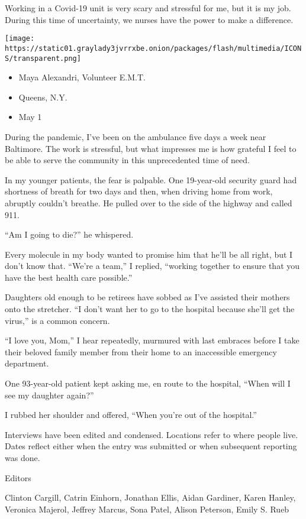 Working in a Covid-19 unit is very scary and stressful for me, but it is
my job. During this time of uncertainty, we nurses have the power to
make a difference.

\texttt{[image: https://static01.graylady3jvrrxbe.onion/packages/flash/multimedia/ICONS/transparent.png]}

\begin{itemize}
\tightlist
\item
  Maya Alexandri, Volunteer E.M.T.
\item
  Queens, N.Y.
\item
  May 1
\end{itemize}

During the pandemic, I've been on the ambulance five days a week near
Baltimore. The work is stressful, but what impresses me is how grateful
I feel to be able to serve the community in this unprecedented time of
need.

In my younger patients, the fear is palpable. One 19-year-old security
guard had shortness of breath for two days and then, when driving home
from work, abruptly couldn't breathe. He pulled over to the side of the
highway and called 911.

``Am I going to die?'' he whispered.

Every molecule in my body wanted to promise him that he'll be all right,
but I don't know that. ``We're a team,'' I replied, ``working together
to ensure that you have the best health care possible.''

Daughters old enough to be retirees have sobbed as I've assisted their
mothers onto the stretcher. ``I don't want her to go to the hospital
because she'll get the virus,'' is a common concern.

``I love you, Mom,'' I hear repeatedly, murmured with last embraces
before I take their beloved family member from their home to an
inaccessible emergency department.

One 93-year-old patient kept asking me, en route to the hospital, ``When
will I see my daughter again?''

I rubbed her shoulder and offered, ``When you're out of the hospital.''

Interviews have been edited and condensed. Locations refer to where
people live. Dates reflect either when the entry was submitted or when
subsequent reporting was done.

Editors

Clinton Cargill, Catrin Einhorn, Jonathan Ellis, Aidan Gardiner, Karen
Hanley, Veronica Majerol, Jeffrey Marcus, Sona Patel, Alison Peterson,
Emily S. Rueb

